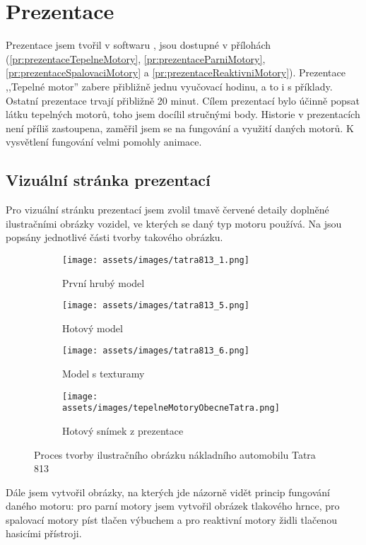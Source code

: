 \section{Prezentace}
{Prezentace jsem tvořil v softwaru , jsou dostupné v přílohách (\ref{pr:prezentaceTepelneMotory}, \ref{pr:prezentaceParniMotory}, \ref{pr:prezentaceSpalovaciMotory} a \ref{pr:prezentaceReaktivniMotory}). Prezentace ,,Tepelné motor'' zabere přibližně jednu vyučovací hodinu, a to i s příklady. Ostatní prezentace trvají přibližně 20 minut.}\odst
{Cílem prezentací bylo účinně popsat látku tepelných motorů, toho jsem docílil stručnými body. Historie v prezentacích není příliš zastoupena, zaměřil jsem se na fungování a využití daných motorů. K vysvětlení fungování velmi pomohly animace.}

\subsection{Vizuální stránka prezentací}
{Pro vizuální stránku prezentací jsem zvolil tmavě červené detaily doplněné ilustračními obrázky vozidel, ve kterých se daný typ motoru používá. Na  jsou popsány jednotlivé části tvorby takového obrázku.}

\begin{figure}[H]
    \begin{subfigure}{0.5\textwidth}
        \centering
        \texttt{[image: assets/images/tatra813\_1.png]}\\
        \caption{První hrubý model}
    \end{subfigure}
    \begin{subfigure}{0.5\linewidth}
        \centering
        \texttt{[image: assets/images/tatra813\_5.png]}\\
        \caption{Hotový model}
    \end{subfigure}
    \begin{subfigure}{0.5\linewidth}
        \centering
        \texttt{[image: assets/images/tatra813\_6.png]}\\
        \caption{Model s texturamy}
    \end{subfigure}
    \begin{subfigure}{0.5\linewidth}
        \centering
        \texttt{[image: assets/images/tepelneMotoryObecneTatra.png]}\\
        \caption{Hotový snímek z prezentace}
    \end{subfigure}
    \caption{Proces tvorby ilustračního obrázku nákladního automobilu Tatra 813 \jaObr}
    \label{obr:tatra813}
\end{figure}

{Dále jsem vytvořil obrázky, na kterých jde názorně vidět princip fungování daného motoru: pro parní motory jsem vytvořil obrázek tlakového hrnce, pro spalovací motory píst tlačen výbuchem a pro reaktivní motory židli tlačenou hasicími přístroji.}